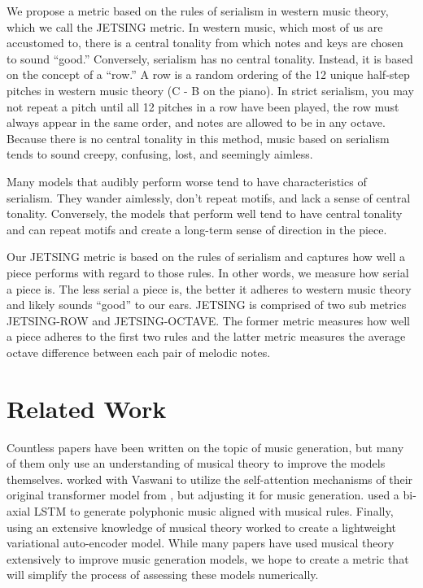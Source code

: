 \documentclass[11pt]{article}
\begin{document}
We propose a metric based on the rules of serialism in western music theory, which we call the JETSING metric.
In western music, which most of us are accustomed to, there is a central tonality from which notes and keys are chosen to sound “good.”
Conversely, serialism has no central tonality. Instead, it is based on the concept of a “row.”
A row is a random ordering of the 12 unique half-step pitches in western music theory (C - B on the piano).
In strict serialism, you may not repeat a pitch until all 12 pitches in a row have been played, the row must always appear in the same order, and notes are allowed to be in any octave.
Because there is no central tonality in this method, music based on serialism tends to sound creepy, confusing, lost, and seemingly aimless.

Many models that audibly perform worse tend to have characteristics of serialism.
They wander aimlessly, don’t repeat motifs, and lack a sense of central tonality.
Conversely, the models that perform well tend to have central tonality and can repeat motifs and create a long-term sense of direction in the piece.

Our JETSING metric is based on the rules of serialism and captures how well a piece performs with regard to those rules.
In other words, we measure how serial a piece is.
The less serial a piece is, the better it adheres to western music theory and likely sounds “good” to our ears.
JETSING is comprised of two sub metrics JETSING-ROW and JETSING-OCTAVE.
The former metric measures how well a piece adheres to the first two rules and the latter metric measures the average octave difference between each pair of melodic notes.

\section{Related Work}
Countless papers have been written on the topic of music generation, but many of them only use an understanding of musical theory to improve the models themselves.
\citep{huang2018music} worked with Vaswani to utilize the self-attention mechanisms of their original transformer model from \citep{vaswani2017attention}, but adjusting it for music generation.
\citep{kotecha2018generating} used a bi-axial LSTM to generate polyphonic music aligned with musical rules.
Finally, \citep{zhao2020verticalhorizontal} using an extensive knowledge of musical theory worked to create a lightweight variational auto-encoder model.
While many papers have used musical theory extensively to improve music generation models, we hope to create a metric that will simplify the process of assessing these models numerically.
\end{document}
